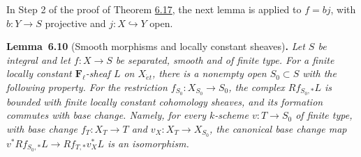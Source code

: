 \documentclass[11pt]{article}
\newenvironment{bpstatement}[2]{\par\addvspace{0.6\baselineskip}\noindent\textbf{#1}#2\textbf{.}\enspace\ignorespaces}
  {\par\addvspace{0.4\baselineskip}}
\newenvironment{bpstatementit}[2]{\begin{bpstatement}{#1}{#2}\itshape\ignorespaces}{\end{bpstatement}}
\providecommand{\Fell}{}\renewcommand{\Fell}{\mathbf F_\ell}
\begin{document}
\label{bp32}%
In Step 2 of the proof of Theorem \hyperref[bp51]{6.17}, the next lemma is applied to \(f=bj\), with \(b:Y\to S\) projective and \(j:X\hookrightarrow Y\) open.

\label{bp33}%
\begin{bpstatementit}{Lemma~6.10}{ (Smooth morphisms and locally constant sheaves)}
Let \(S\) be integral and let \(f:X\to S\) be separated, smooth and of finite type. For a finite locally constant \(\Fell\)-sheaf \(L\) on \(X_{\acute{e}t}\), there is a nonempty open \(S_0\subset S\) with the following property. For the restriction \(f_{S_0}:X_{S_0}\to S_0\), the complex \(Rf_{S_0,*}L\) is bounded with finite locally constant cohomology sheaves, and its formation commutes with base change. Namely, for every \(k\)-scheme \(v:T\to S_0\) of finite type, with base change \(f_T:X_T\to T\) and \(v_X:X_T\to X_{S_0}\), the canonical base change map \(v^*Rf_{S_0,*}L\to Rf_{T,*}v_X^*L\) is an isomorphism.
\end{bpstatementit}
\end{document}
